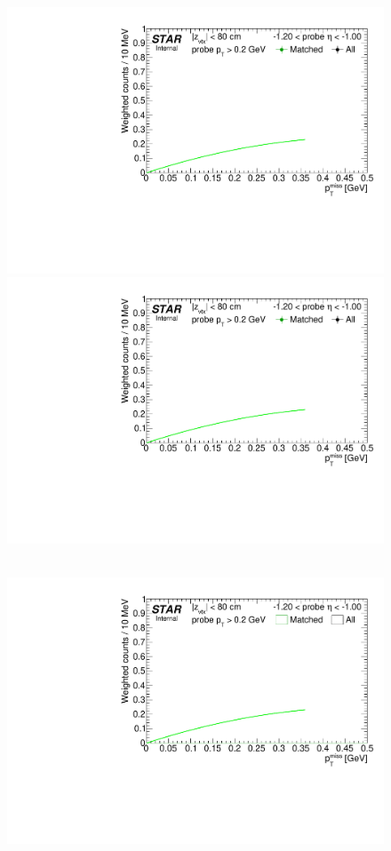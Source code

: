 \begin{figure}
{  \includegraphics[width=\linewidth,page=4]{graphics/correctionsToEff/TOF_tagAndProbe/Fitting_effVsEta_data.CPT.pdf}\\
  \includegraphics[width=\linewidth,page=5]{graphics/correctionsToEff/TOF_tagAndProbe/Fitting_effVsEta_data.CPT.pdf}
}~
\parbox{0.495\textwidth}{
  \centering
  \includegraphics[width=\linewidth,page=2]{graphics/correctionsToEff/TOF_tagAndProbe/Fitting_effVsEta_mc.CPT.pdf}\\
}
\end{figure}
